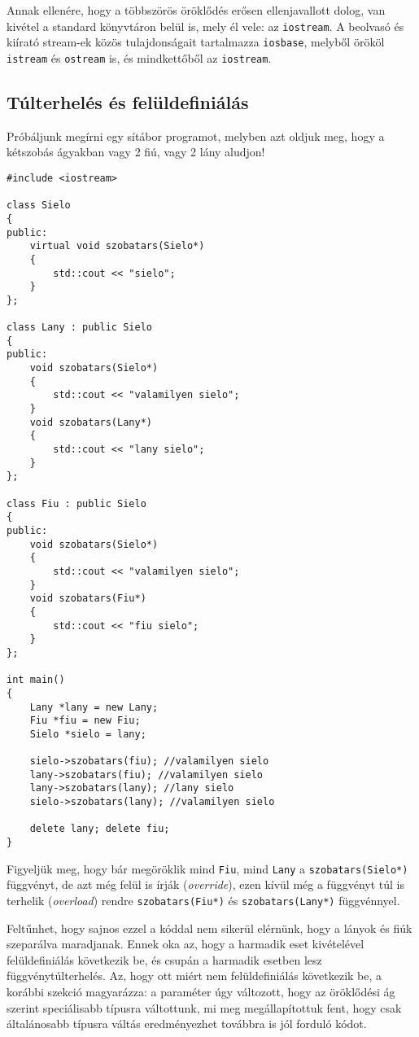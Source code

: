 \documentclass[a4paper,11.5pt,table]{article}
\begin{document}
	Annak ellenére, hogy a többszörös öröklődés erősen ellenjavallott dolog, van kivétel a standard könyvtáron belül is, mely él vele: az \texttt{iostream}. A beolvasó és kiírató stream-ek közös tulajdonságait tartalmazza \texttt{iosbase}, melyből örököl \texttt{istream} és \texttt{ostream} is, és mindkettőből az \texttt{iostream}.
	\subsection{Túlterhelés és felüldefiniálás}
	Próbáljunk megírni egy sítábor programot, melyben azt oldjuk meg, hogy a kétszobás ágyakban vagy 2 fiú, vagy 2 lány aludjon!
\begin{lstlisting}
#include <iostream>

class Sielo
{
public:
	virtual void szobatars(Sielo*)
	{
		std::cout << "sielo";
	}
};

class Lany : public Sielo
{
public:
	void szobatars(Sielo*)
	{
		std::cout << "valamilyen sielo";
	}
	void szobatars(Lany*)
	{
		std::cout << "lany sielo";
	}
};

class Fiu : public Sielo
{
public:
	void szobatars(Sielo*)
	{
		std::cout << "valamilyen sielo";
	}
	void szobatars(Fiu*)
	{
		std::cout << "fiu sielo";
	}
};

int main()
{
	Lany *lany = new Lany;
	Fiu *fiu = new Fiu;
	Sielo *sielo = lany;
	
	sielo->szobatars(fiu); //valamilyen sielo
	lany->szobatars(fiu); //valamilyen sielo
	lany->szobatars(lany); //lany sielo
	sielo->szobatars(lany); //valamilyen sielo
	
	delete lany; delete fiu;
}
\end{lstlisting}
	Figyeljük meg, hogy bár megöröklik mind \texttt{Fiu}, mind \texttt{Lany} a \texttt{szobatars(Sielo*)} függvényt, de azt még felül is írják (\textit{override}), ezen kívül még a függvényt túl is terhelik (\textit{overload}) rendre \texttt{szobatars(Fiu*)} és \texttt{szobatars(Lany*)} függvénnyel. 
	
	Feltűnhet, hogy sajnos ezzel a kóddal nem sikerül elérnünk, hogy a lányok és fiúk szeparálva maradjanak. Ennek oka az, hogy a harmadik eset kivételével felüldefiniálás következik be, és csupán a harmadik esetben lesz függvénytúlterhelés. Az, hogy ott miért nem felüldefiniálás következik be, a korábbi szekció magyarázza: a paraméter úgy változott, hogy az öröklődési ág szerint speciálisabb típusra váltottunk, mi meg megállapítottuk fent, hogy csak általánosabb típusra váltás eredményezhet továbbra is jól forduló kódot.
	
\end{document}
